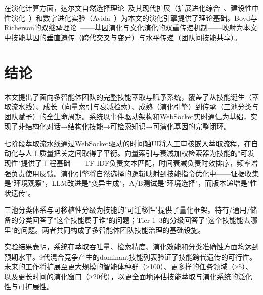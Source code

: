 \documentclass[conference]{IEEEtran}
\begin{document}
在演化计算方面，达尔文自然选择理论~\cite{darwin1859}及其现代扩展（扩展进化综合~\cite{pigliucci2010extended,laland2015extended}、建设性中性演化~\cite{stoltzfus1999constructive}）和数字进化实验（Avida~\cite{lenski2003evolutionary}）为本文的演化引擎提供了理论基础。Boyd与Richerson的双继承理论~\cite{boyd1985culture}——基因演化与文化演化的双重传递机制——映射为本文中技能基因的垂直遗传（跨代交叉与变异）与水平传递（团队间技能共享）。

\section{结论}

本文提出了面向多智能体团队的完整技能萃取与赋予系统，覆盖了从技能诞生（萃取流水线）、成长（向量索引与衰减检索）、成熟（演化引擎）到传承（三池分类与团队赋予）的全生命周期。系统以事件驱动架构和WebSocket实时通信为基础，实现了非结构化对话→结构化技能→可检索知识→可演化基因的完整闭环。

七阶段萃取流水线通过WebSocket驱动的时间轴UI将人工审核嵌入萃取流程，在自动化与人工质量把关之间取得了平衡。向量索引与衰减加权检索器为技能的"可发现性"提供了工程基础——TF-IDF负责文本匹配，时间衰减负责时效排序，频率增强负责使用反馈。演化引擎将自然选择的逻辑映射到技能指令优化中——证据收集是"环境观察"，LLM改进是"变异生成"，A/B测试是"环境选择"，而版本递增是"性状遗传"。

三池分类体系与可移植性分级为技能的"可迁移性"提供了量化框架。特有/通用/储备的分类回答了"这个技能属于谁"的问题；Tier 1--3的分级回答了"这个技能能去哪里"的问题。两者共同构成了多智能体团队技能治理的基础设施。

实验结果表明，系统在萃取吞吐量、检索精度、演化效能和分类准确性方面均达到预期水平。9代混合竞争产生的dominant技能列表验证了技能跨代遗传的可行性。未来的工作将扩展至更大规模的智能体种群（≥100）、更多样的任务领域（≥5）、以及更长时间的演化窗口（≥20代），以更全面地评估技能萃取与演化系统的泛化性与可扩展性。



\end{document}
